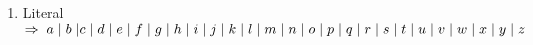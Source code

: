 \begin{enumerate}
\item Literal $\Rightarrow \hspace{1 mm}  a  \hspace{1 mm} \vert \hspace{1 mm}  b  \hspace{1 mm}  \vert c \hspace{1 mm}  \vert \hspace{1 mm} d \hspace{1 mm} \vert \hspace{1 mm} e \hspace{1 mm} \vert \hspace{1 mm} f \hspace{1 mm} \vert \hspace{1 mm} g \hspace{1 mm} \vert \hspace{1 mm} h \hspace{1 mm} \vert \hspace{1 mm} i \hspace{1 mm} \vert \hspace{1 mm} j \hspace{1 mm} \vert \hspace{1 mm} k \hspace{1 mm} \vert \hspace{1 mm} l \hspace{1 mm} \vert \hspace{1 mm} m \hspace{1 mm} \vert \hspace{1 mm} n \hspace{1 mm} \vert \hspace{1 mm} o \hspace{1 mm} \vert \hspace{1 mm} p \hspace{1 mm} \vert \hspace{1 mm} q \hspace{1 mm} \vert \hspace{1 mm} r \hspace{1 mm} \vert \hspace{1 mm} s \hspace{1 mm} \vert \hspace{1 mm} t \hspace{1 mm} \vert \hspace{1 mm} u \hspace{1 mm} \vert \hspace{1 mm} v \hspace{1 mm} \vert \hspace{1 mm} w \hspace{1 mm} \vert \hspace{1 mm} x \hspace{1 mm} \vert \hspace{1 mm} y \hspace{1 mm} \vert \hspace{1 mm} z$

\end{enumerate}

